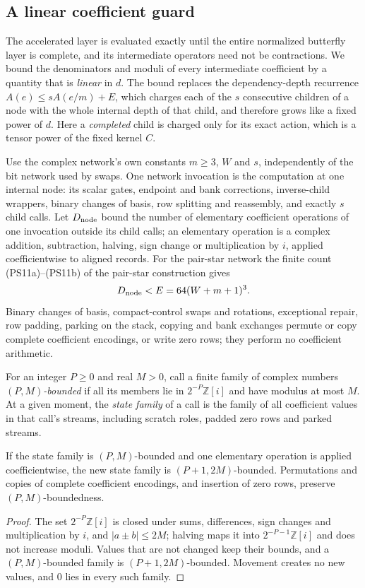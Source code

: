 \subsection{A linear coefficient guard}
\label{sec:linear-guard}
The accelerated layer is evaluated exactly until the entire normalized
butterfly layer is complete, and its intermediate operators need not be
contractions. We bound the denominators and moduli of every intermediate
coefficient by a quantity that is \emph{linear} in $d$. The bound replaces the
dependency-depth recurrence $A(e)\le sA(e/m)+E$, which charges each of the
$s$ consecutive children of a node with the whole internal depth of that
child, and therefore grows like a fixed power of $d$. Here a \emph{completed}
child is charged only for its exact action, which is a tensor power of the
fixed kernel $C$.

Use the complex network's own constants $m\ge3$, $W$ and $s$, independently
of the bit network used by swaps. One network invocation is the computation
at one internal node: its scalar gates, endpoint and bank corrections,
inverse-child wrappers, binary changes of basis, row splitting and
reassembly, and exactly $s$ child calls. Let $D_{\rm node}$ bound the number
of elementary coefficient operations of one invocation outside its child
calls; an elementary operation is a complex addition, subtraction, halving,
sign change or multiplication by $i$, applied coefficientwise to aligned
records. For the pair-star network the finite count (PS11a)--(PS11b) of the
pair-star construction gives
\[
 D_{\rm node}<E=64(W+m+1)^3 .
\]
Binary changes of basis, compact-control swaps and rotations, exceptional
repair, row padding, parking on the stack, copying and bank exchanges
permute or copy complete coefficient encodings, or write zero rows; they
perform no coefficient arithmetic.

For an integer $P\ge0$ and real $M>0$, call a finite family of complex numbers
\emph{$(P,M)$-bounded} if all its members lie in $2^{-P}\mathbb Z[i]$ and have
modulus at most $M$. At a given moment, the \emph{state family} of a call is
the family of all coefficient values in that call's streams, including
scratch roles, padded zero rows and parked streams.

\begin{lemma}\label{lem:guard-steps}
If the state family is $(P,M)$-bounded and one elementary operation is applied
coefficientwise, the new state family is $(P+1,2M)$-bounded. Permutations and
copies of complete coefficient encodings, and insertion of zero rows, preserve
$(P,M)$-boundedness.
\end{lemma}
\begin{proof}
The set $2^{-P}\mathbb Z[i]$ is closed under sums, differences, sign changes
and multiplication by $i$, and $|a\pm b|\le2M$; halving maps it into
$2^{-P-1}\mathbb Z[i]$ and does not increase moduli. Values that are not
changed keep their bounds, and a $(P,M)$-bounded family is
$(P+1,2M)$-bounded. Movement creates no new values, and $0$ lies in every
such family.
\end{proof}

